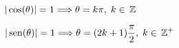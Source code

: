 \begin{Solution}{1.1}
     $|\cos(\theta)|=1 \Longrightarrow \theta=k\pi, \; k \in\, \mathbb{Z}$
   
\end{Solution}
\begin{Solution}{1.2}
    $|\mathop{\rm sen}\nolimits(\theta)|=1 \Longrightarrow \theta=(2k+1)\displaystyle\frac{\pi}{2}, \; k \in\, \mathbb{Z}^+$
   
\end{Solution}
